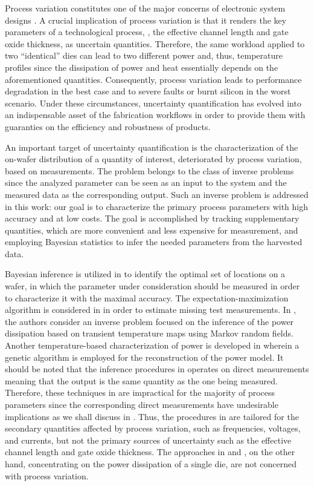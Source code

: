 Process variation constitutes one of the major concerns of electronic system designs \cite{chandrakasan2001, srivastava2010}. A crucial implication of process variation is that it renders the key parameters of a technological process, \eg, the effective channel length and gate oxide thickness, as uncertain quantities.
Therefore, the same workload applied to two ``identical'' dies can lead to two different power and, thus, temperature profiles since the dissipation of power and heat essentially depends on the aforementioned quantities.
Consequently, process variation leads to performance degradation in the best case and to severe faults or burnt silicon in the worst scenario.
Under these circumstances, uncertainty quantification has evolved into an indispensable asset of the fabrication workflows in order to provide them with guaranties on the efficiency and robustness of products.

An important target of uncertainty quantification is the characterization of the on-wafer distribution of a quantity of interest, deteriorated by process variation, based on measurements.
The problem belongs to the class of inverse problems since the analyzed parameter can be seen as an input to the system and the measured data as the corresponding output.
Such an inverse problem is addressed in this work: our goal is to characterize the primary process parameters with high accuracy and at low costs.
The goal is accomplished by tracking supplementary quantities, which are more convenient and less expensive for measurement, and employing Bayesian statistics \cite{gelman2004} to infer the needed parameters from the harvested data.

Bayesian inference is utilized in \cite{zhang2010} to identify the optimal set of locations on a wafer, in which the parameter under consideration should be measured in order to characterize it with the maximal accuracy.
The expectation-maximization algorithm is considered in \cite{reda2009} in order to estimate missing test measurements.
In \cite{paek2012}, the authors consider an inverse problem focused on the inference of the power dissipation based on transient temperature maps using Markov random fields.
Another temperature-based characterization of power is developed in \cite{mesa-martinez2007} wherein a genetic algorithm is employed for the reconstruction of the power model.
It should be noted that the inference procedures in \cite{zhang2010, reda2009} operates on direct measurements meaning that the output is the same quantity as the one being measured.
Therefore, these techniques in \cite{zhang2010, reda2009} are impractical for the majority of process parameters since the corresponding direct measurements have undesirable implications as we shall discuss in .
Thus, the procedures in \cite{zhang2010, reda2009} are tailored for the secondary quantities affected by process variation, such as frequencies, voltages, and currents, but not the primary sources of uncertainty such as the effective channel length and gate oxide thickness.
The approaches in \cite{paek2012} and \cite{mesa-martinez2007}, on the other hand, concentrating on the power dissipation of a single die, are not concerned with process variation.

